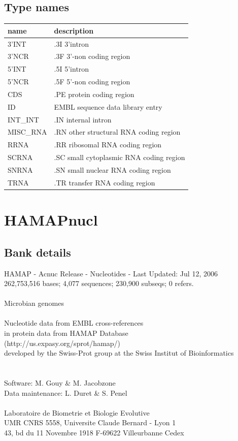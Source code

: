 \documentclass{article}
\begin{document}
\begin{Schunk}
\subsection{Type names}
\noindent\begin{tabular}{ll}
\hline \hline
name & description\\
\hline
3'INT & .3I 3'intron \\
3'NCR & .3F  3'-non coding region \\
5'INT & .5I 5'intron \\
5'NCR & .5F  5'-non coding region \\
CDS & .PE protein coding region \\
ID & EMBL sequence data library entry \\
INT\_INT & .IN  internal intron \\
MISC\_RNA & .RN other structural RNA coding region \\
RRNA & .RR ribosomal RNA coding region \\
SCRNA & .SC small cytoplasmic RNA coding region \\
SNRNA & .SN small nuclear RNA coding region \\
TRNA & .TR transfer RNA coding region \\
\hline \hline
\end{tabular}

\section{ HAMAPnucl }
\subsection{Bank details}
HAMAP - Acnuc Release - Nucleotides - Last Updated: Jul 12, 2006\\
262,753,516 bases; 4,077 sequences; 230,900 subseqs; 0 refers.\\
	\\
Microbian genomes\\
\\
Nucleotide data from  EMBL cross-references		\\
in protein data from  HAMAP Database\\
(http://us.expasy.org/sprot/hamap/)\\
developed by the Swiss-Prot group at the Swiss Institut of Bioinformatics\\
\\
\\
Software: M. Gouy \& M. Jacobzone\\
Data maintenance: L. Duret \& S. Penel\\
\\
Laboratoire de Biometrie et Biologie Evolutive\\
UMR CNRS 5558, Universite Claude Bernard - Lyon 1\\
43, bd du 11 Novembre 1918 F-69622 Villeurbanne Cedex\\



\end{Schunk}
\end{document}
